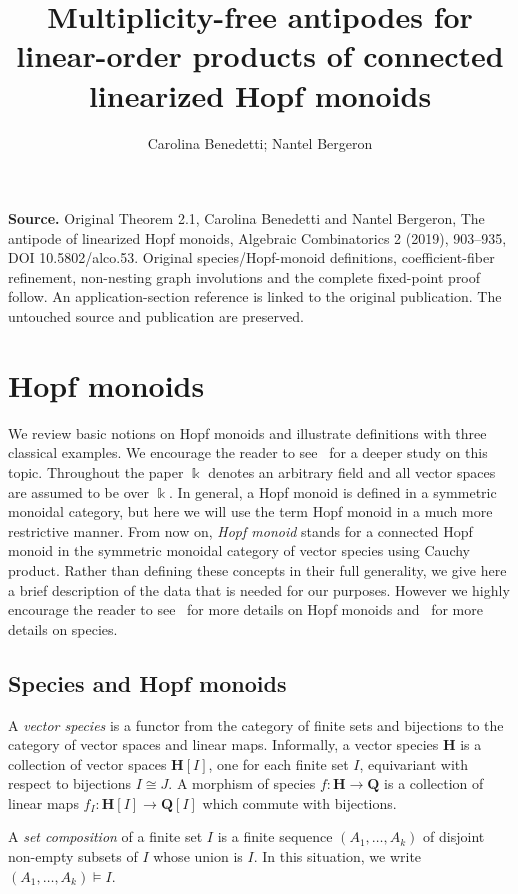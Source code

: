 \documentclass[10pt]{amsart}
\title[Antipodes of linearized Hopf monoids]{Multiplicity-free antipodes for linear-order products of connected linearized Hopf monoids}
\author{Carolina Benedetti; Nantel Bergeron}
\date{}
\theoremstyle{definition}
\def\field{\Bbbk}
\newcommand{\bH}{\mathbf{H}}
\begin{document}
\maketitle
\noindent\textbf{Source.} Original Theorem 2.1, Carolina Benedetti and Nantel Bergeron, The antipode of linearized Hopf monoids, Algebraic Combinatorics 2 (2019), 903--935, DOI 10.5802/alco.53. Original species/Hopf-monoid definitions, coefficient-fiber refinement, non-nesting graph involutions and the complete fixed-point proof follow. An application-section reference is linked to the original publication. The untouched source and publication are preserved.
\section{Hopf monoids}\label{s:hopf}


We review basic notions on Hopf monoids and illustrate definitions with three classical examples. We encourage the reader to see~\cite{AM:2010} for a deeper study on this topic. Throughout the paper $\field$ denotes an arbitrary field and all vector spaces are assumed to be over $\field$. 
In general, a Hopf monoid is defined in a symmetric monoidal category, but here we will use the term {Hopf monoid} in a much more
restrictive manner. From now on, \emph{Hopf monoid} stands for a connected Hopf monoid in the symmetric monoidal category of vector species using Cauchy product. Rather than defining these concepts in their full generality, we give here a brief description of the data that is needed for our purposes. However we highly encourage the reader to see~\cite{AM:2010} for more details on Hopf monoids and~\cite{species98} for more details on species.


\subsection{Species and Hopf monoids}\label{ss:sp-hopf}
A \emph{vector species} is a functor from the category of finite sets and bijections to the category of vector spaces and linear maps. Informally, a {vector species} $\bH$ is a collection of vector spaces $\bH[I]$,
one for each finite set $I$, equivariant with respect to bijections $I\cong J$.
A morphism of species $f:\bH\to\mathbf{Q}$ is a collection of linear maps
$f_I:\bH[I]\to{\mathbf{Q}}[I]$ which commute with bijections.

A \emph{set composition} of a finite set $I$ is a finite sequence $(A_1,\ldots,A_k)$
of disjoint non-empty subsets of $I$ whose union is $I$. In this situation, we write
$
(A_1,\ldots,A_k)\models I.
$
\end{document}
